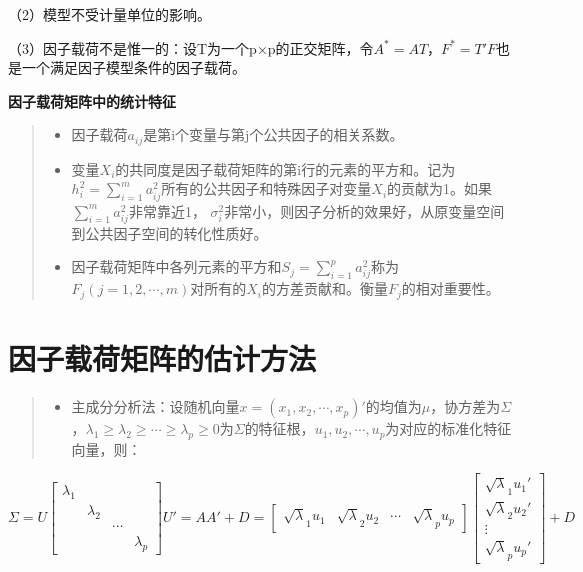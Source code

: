 \documentclass[]{ctexbook}
\providecommand{\tightlist}{%
  \setlength{\itemsep}{0pt}\setlength{\parskip}{0pt}}
\begin{document}
（2）模型不受计量单位的影响。

（3）因子载荷不是惟一的：设T为一个p×p的正交矩阵，令\(A^*=AT， F^*=T'F\)也是一个满足因子模型条件的因子载荷。

\textbf{因子载荷矩阵中的统计特征}

\begin{quote}
\begin{itemize}
\tightlist
\item
  因子载荷\(a_{ij}\)是第i个变量与第j个公共因子的相关系数。
\item
  变量\(X_i\)的共同度是因子载荷矩阵的第i行的元素的平方和。记为\(h_i^2=\sum_{i=1}^ma_{ij}^2\)所有的公共因子和特殊因子对变量\(X_i\)的贡献为1。如果\(\sum_{i=1}^ma_{ij}^2\)非常靠近1， \(\sigma_i^2\)非常小，则因子分析的效果好，从原变量空间到公共因子空间的转化性质好。
\item
  因子载荷矩阵中各列元素的平方和\(S_j=\sum_{i=1}^pa_{ij}^2\)\(称为\)\(F_j(j=1,2,\cdots,m)\)对所有的\(X_i\)的方差贡献和。衡量\(F_j\)的相对重要性。
\end{itemize}
\end{quote}

\hypertarget{ux56e0ux5b50ux8f7dux8377ux77e9ux9635ux7684ux4f30ux8ba1ux65b9ux6cd5}{%
\section{因子载荷矩阵的估计方法}\label{ux56e0ux5b50ux8f7dux8377ux77e9ux9635ux7684ux4f30ux8ba1ux65b9ux6cd5}}

\begin{quote}
\begin{itemize}
\tightlist
\item
  主成分分析法：设随机向量\(x=(x_1,x_2,\cdots,x_p)'\)的均值为\(\mu\)，协方差为\(\Sigma\)，\(\lambda_1\ge\lambda_2\ge\cdots\ge\lambda_p\ge0\)为\(\Sigma\)的特征根，\(u_1,u_2,\cdots,u_p\)为对应的标准化特征向量，则：
\end{itemize}
\end{quote}

\[\Sigma=U\begin {bmatrix}\lambda_1&&&\\&\lambda_2&&\\&&\cdots&\\&&&\lambda_p \end {bmatrix}U'=AA'+D=\begin {bmatrix}\sqrt\lambda_1u_1&\sqrt\lambda_2u_2&\cdots&\sqrt\lambda_pu_p \end {bmatrix}\begin {bmatrix}\sqrt\lambda_1u_1'\\\sqrt\lambda_2u_2'\\\vdots\\\sqrt\lambda_pu_p' \end {bmatrix}+D\]
\end{document}
